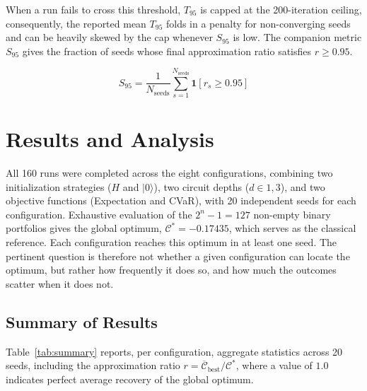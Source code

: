\documentclass[runningheads]{llncs}
\begin{document}
When a run fails to cross this threshold, $T_{95}$ is capped at the 200-iteration ceiling, consequently, the reported mean $T_{95}$ folds in a penalty for non-converging seeds and can be heavily skewed by the cap whenever $S_{95}$ is low. The companion metric $S_{95}$ gives the fraction of seeds whose final approximation ratio satisfies $r\geq0.95$.

\[
S_{95}=\frac{1}{N_{\mathrm{seeds}}}\sum_{s=1}^{N_{\mathrm{seeds}}}\mathbf{1}[r_s\geq0.95]
\]
\section{Results and Analysis}\label{analysis}

All 160 runs were completed across the eight configurations, combining two initialization strategies ($H$ and $|0\rangle$), two circuit depths ($d\in{1,3}$), and two objective functions (Expectation and CVaR), with 20 independent seeds for each configuration.
Exhaustive evaluation of the $2^n - 1 = 127$ non-empty binary portfolios gives the global optimum, $\mathcal{C}^* = -0.17435$, which serves as the classical reference. Each configuration reaches this optimum in at least one seed. The pertinent question is therefore not whether a given configuration can locate the optimum, but rather how frequently it does so, and how much the outcomes scatter when it does not.

\subsection{Summary of Results}
Table~\ref{tab:summary} reports, per configuration, aggregate statistics across 20 seeds, including the approximation ratio $r = \overline{\mathcal{C}}_{\text{best}} /\mathcal{C}^*$, where a value of $1.0$ indicates perfect average recovery of the global optimum.
\end{document}
